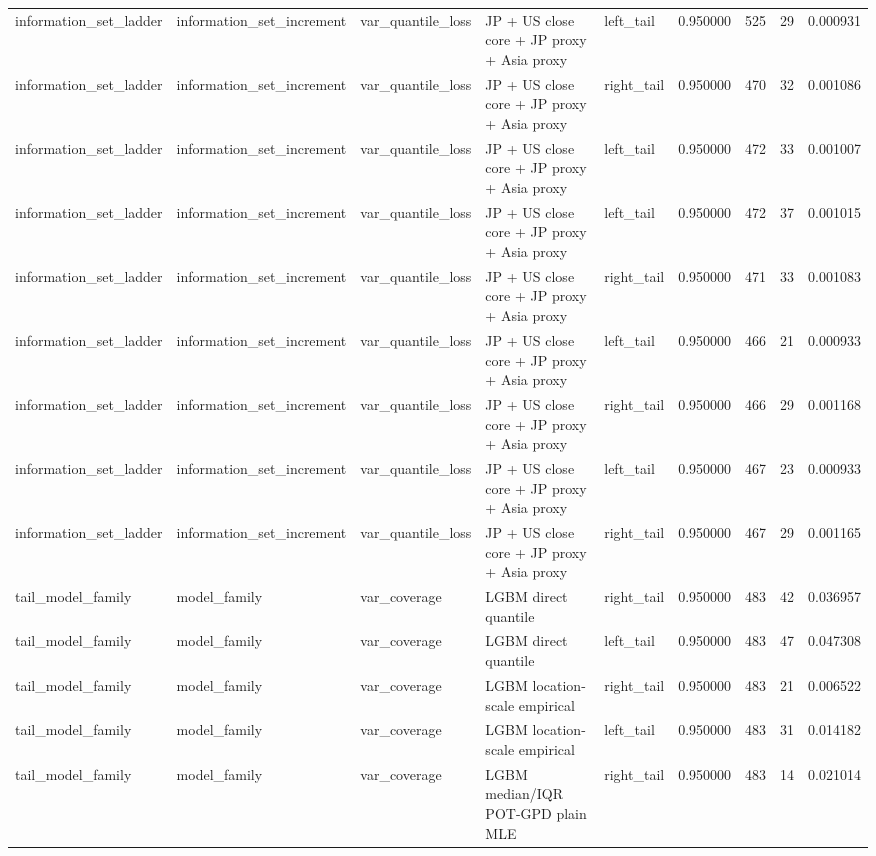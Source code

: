 \begin{tabular}{lllllrrrr}
information\_set\_ladder & information\_set\_increment & var\_quantile\_loss & JP + US close core + JP proxy + Asia proxy & left\_tail & 0.950000 & 525 & 29 & 0.000931 \\
information\_set\_ladder & information\_set\_increment & var\_quantile\_loss & JP + US close core + JP proxy + Asia proxy & right\_tail & 0.950000 & 470 & 32 & 0.001086 \\
information\_set\_ladder & information\_set\_increment & var\_quantile\_loss & JP + US close core + JP proxy + Asia proxy & left\_tail & 0.950000 & 472 & 33 & 0.001007 \\
information\_set\_ladder & information\_set\_increment & var\_quantile\_loss & JP + US close core + JP proxy + Asia proxy & left\_tail & 0.950000 & 472 & 37 & 0.001015 \\
information\_set\_ladder & information\_set\_increment & var\_quantile\_loss & JP + US close core + JP proxy + Asia proxy & right\_tail & 0.950000 & 471 & 33 & 0.001083 \\
information\_set\_ladder & information\_set\_increment & var\_quantile\_loss & JP + US close core + JP proxy + Asia proxy & left\_tail & 0.950000 & 466 & 21 & 0.000933 \\
information\_set\_ladder & information\_set\_increment & var\_quantile\_loss & JP + US close core + JP proxy + Asia proxy & right\_tail & 0.950000 & 466 & 29 & 0.001168 \\
information\_set\_ladder & information\_set\_increment & var\_quantile\_loss & JP + US close core + JP proxy + Asia proxy & left\_tail & 0.950000 & 467 & 23 & 0.000933 \\
information\_set\_ladder & information\_set\_increment & var\_quantile\_loss & JP + US close core + JP proxy + Asia proxy & right\_tail & 0.950000 & 467 & 29 & 0.001165 \\
tail\_model\_family & model\_family & var\_coverage & LGBM direct quantile & right\_tail & 0.950000 & 483 & 42 & 0.036957 \\
tail\_model\_family & model\_family & var\_coverage & LGBM direct quantile & left\_tail & 0.950000 & 483 & 47 & 0.047308 \\
tail\_model\_family & model\_family & var\_coverage & LGBM location-scale empirical & right\_tail & 0.950000 & 483 & 21 & 0.006522 \\
tail\_model\_family & model\_family & var\_coverage & LGBM location-scale empirical & left\_tail & 0.950000 & 483 & 31 & 0.014182 \\
tail\_model\_family & model\_family & var\_coverage & LGBM median/IQR POT-GPD plain MLE & right\_tail & 0.950000 & 483 & 14 & 0.021014 \\

\end{tabular}
